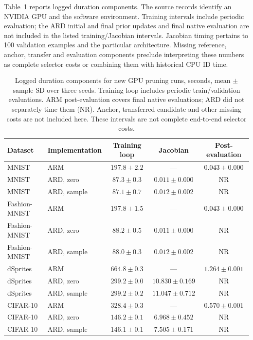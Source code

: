 \documentclass[make,article,submit,pdftex,moreauthors]{Definitions/mdpi}
\begin{document}
Table~\ref{tab:newcost} reports logged duration components. The source
records identify an NVIDIA GPU and the software environment. Training
intervals include periodic evaluation; the ARD initial and final prior
updates and final native evaluation are not included in the listed
training/Jacobian intervals. Jacobian timing pertains to 100 validation
examples and the particular architecture. Missing reference, anchor,
transfer and evaluation components preclude interpreting these numbers
as complete selector costs or combining them with historical CPU ID time.
\begin{table}[H]
\caption{Logged duration components for new GPU pruning runs, seconds, mean $\pm$ sample SD over three seeds. Training loop includes periodic train/validation evaluations. ARM post-evaluation covers final native evaluations; ARD did not separately time them (NR). Anchor, transferred-candidate and other missing costs are not included here. These intervals are not complete end-to-end selector costs.}\label{tab:newcost}
\small
\setlength{\tabcolsep}{3pt}
\begin{tabular*}{\textwidth}{@{\extracolsep{\fill}}llccc@{}}
\toprule
Dataset & Implementation & Training loop & Jacobian & Post-evaluation \\
\midrule
MNIST & ARM & $197.8 \pm 2.2$ & --- & $0.043 \pm 0.000$ \\
MNIST & ARD, zero & $87.3 \pm 0.3$ & $0.011 \pm 0.000$ & NR \\
MNIST & ARD, sample & $87.1 \pm 0.7$ & $0.012 \pm 0.002$ & NR \\
Fashion-MNIST & ARM & $197.8 \pm 1.5$ & --- & $0.043 \pm 0.000$ \\
Fashion-MNIST & ARD, zero & $88.2 \pm 0.5$ & $0.011 \pm 0.000$ & NR \\
Fashion-MNIST & ARD, sample & $88.0 \pm 0.3$ & $0.012 \pm 0.002$ & NR \\
dSprites & ARM & $664.8 \pm 0.3$ & --- & $1.264 \pm 0.001$ \\
dSprites & ARD, zero & $299.2 \pm 0.0$ & $10.830 \pm 0.169$ & NR \\
dSprites & ARD, sample & $299.2 \pm 0.2$ & $11.047 \pm 0.712$ & NR \\
CIFAR-10 & ARM & $328.4 \pm 0.3$ & --- & $0.570 \pm 0.001$ \\
CIFAR-10 & ARD, zero & $146.2 \pm 0.1$ & $6.968 \pm 0.452$ & NR \\
CIFAR-10 & ARD, sample & $146.1 \pm 0.1$ & $7.505 \pm 0.171$ & NR \\
\bottomrule\end{tabular*}
\end{table}
\end{document}
